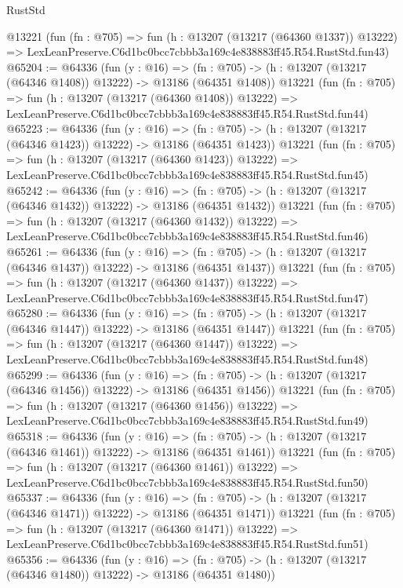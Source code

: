 \begin{lexlean}{RustStd}
\begin{coremodule}
    @13221
    (fun (fn : @705) =>
    fun (h : @13207 (@13217 (@64360 @1337)) @13222) =>
    LexLeanPreserve.C6d1bc0bcc7cbbb3a169c4e838883ff45.R54.RustStd.fun43)
@65204 := @64336
    (fun (y : @16) =>
    (fn : @705) -> (h : @13207 (@13217 (@64346 @1408)) @13222) -> @13186 (@64351 @1408))
    @13221
    (fun (fn : @705) =>
    fun (h : @13207 (@13217 (@64360 @1408)) @13222) =>
    LexLeanPreserve.C6d1bc0bcc7cbbb3a169c4e838883ff45.R54.RustStd.fun44)
@65223 := @64336
    (fun (y : @16) =>
    (fn : @705) -> (h : @13207 (@13217 (@64346 @1423)) @13222) -> @13186 (@64351 @1423))
    @13221
    (fun (fn : @705) =>
    fun (h : @13207 (@13217 (@64360 @1423)) @13222) =>
    LexLeanPreserve.C6d1bc0bcc7cbbb3a169c4e838883ff45.R54.RustStd.fun45)
@65242 := @64336
    (fun (y : @16) =>
    (fn : @705) -> (h : @13207 (@13217 (@64346 @1432)) @13222) -> @13186 (@64351 @1432))
    @13221
    (fun (fn : @705) =>
    fun (h : @13207 (@13217 (@64360 @1432)) @13222) =>
    LexLeanPreserve.C6d1bc0bcc7cbbb3a169c4e838883ff45.R54.RustStd.fun46)
@65261 := @64336
    (fun (y : @16) =>
    (fn : @705) -> (h : @13207 (@13217 (@64346 @1437)) @13222) -> @13186 (@64351 @1437))
    @13221
    (fun (fn : @705) =>
    fun (h : @13207 (@13217 (@64360 @1437)) @13222) =>
    LexLeanPreserve.C6d1bc0bcc7cbbb3a169c4e838883ff45.R54.RustStd.fun47)
@65280 := @64336
    (fun (y : @16) =>
    (fn : @705) -> (h : @13207 (@13217 (@64346 @1447)) @13222) -> @13186 (@64351 @1447))
    @13221
    (fun (fn : @705) =>
    fun (h : @13207 (@13217 (@64360 @1447)) @13222) =>
    LexLeanPreserve.C6d1bc0bcc7cbbb3a169c4e838883ff45.R54.RustStd.fun48)
@65299 := @64336
    (fun (y : @16) =>
    (fn : @705) -> (h : @13207 (@13217 (@64346 @1456)) @13222) -> @13186 (@64351 @1456))
    @13221
    (fun (fn : @705) =>
    fun (h : @13207 (@13217 (@64360 @1456)) @13222) =>
    LexLeanPreserve.C6d1bc0bcc7cbbb3a169c4e838883ff45.R54.RustStd.fun49)
@65318 := @64336
    (fun (y : @16) =>
    (fn : @705) -> (h : @13207 (@13217 (@64346 @1461)) @13222) -> @13186 (@64351 @1461))
    @13221
    (fun (fn : @705) =>
    fun (h : @13207 (@13217 (@64360 @1461)) @13222) =>
    LexLeanPreserve.C6d1bc0bcc7cbbb3a169c4e838883ff45.R54.RustStd.fun50)
@65337 := @64336
    (fun (y : @16) =>
    (fn : @705) -> (h : @13207 (@13217 (@64346 @1471)) @13222) -> @13186 (@64351 @1471))
    @13221
    (fun (fn : @705) =>
    fun (h : @13207 (@13217 (@64360 @1471)) @13222) =>
    LexLeanPreserve.C6d1bc0bcc7cbbb3a169c4e838883ff45.R54.RustStd.fun51)
@65356 := @64336
    (fun (y : @16) =>
    (fn : @705) -> (h : @13207 (@13217 (@64346 @1480)) @13222) -> @13186 (@64351 @1480))

\end{coremodule}
\end{lexlean}
